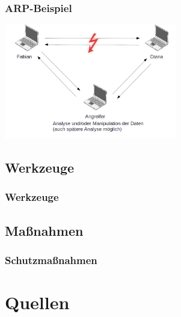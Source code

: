 \documentclass{beamer}
\begin{document}
	   	\begin{frame}
	   		\frametitle{ARP-Beispiel}
	   		\includegraphics[height=5.0cm]{ARP-Tabelle-manipuliert_1.png}
	   	\end{frame}
    	
    	\subsection*{Werkzeuge}
		\begin{frame}
        	\frametitle{Werkzeuge}
                       	
    	\end{frame}
    	\subsection*{Maßnahmen}
		\begin{frame}
        	\frametitle{Schutzmaßnahmen}
                       	
    	\end{frame}

	\section{Quellen}
	
\end{document}
